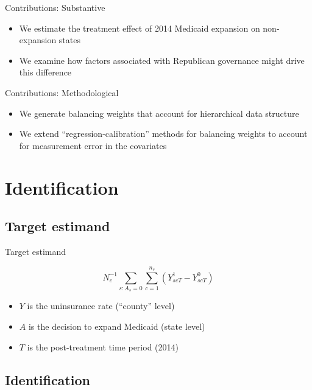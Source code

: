 \documentclass[hyperref={pdfpagelabels=false}]{beamer}
\begin{document}
\begin{frame}{Contributions: Substantive}
\begin{itemize}
    \item We estimate the treatment effect of 2014 Medicaid expansion on non-expansion states \bigskip
    
    \item We examine how factors associated with Republican governance might drive this difference \bigskip
    
    \end{itemize}
\end{frame}

\begin{frame}{Contributions: Methodological}
\begin{itemize}

    \item We generate balancing weights that account for hierarchical data structure \bigskip
    
    \item We extend ``regression-calibration'' methods for balancing weights to account for measurement error in the covariates \bigskip
    \end{itemize}
\end{frame}

\section{Identification}

\subsection{Target estimand}

\begin{frame}{Target estimand}

$$
N_c^{-1}\sum_{s: A_s = 0} \sum_{c = 1}^{n_s} (Y_{scT}^1 - Y_{scT}^0)
$$

\begin{itemize}
    \item $Y$ is the uninsurance rate (``county'' level) \bigskip
    \item $A$ is the decision to expand Medicaid (state level) \bigskip
    \item $T$ is the post-treatment time period (2014)
\end{itemize}
\end{frame}

\subsection{Identification}
\end{document}
